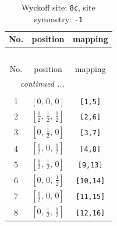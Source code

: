 \documentclass[fleqn,8pt]{jsarticle}
\begin{document}
\renewcommand{\arraystretch}{1.2}
\begin{longtable}{ccc}
\caption{Wyckoff site: {\tt 8c}, site symmetry: {\tt -1}}
 \\
 \hline \hline
No. & position & mapping \\ \hline \endfirsthead

\multicolumn{2}{l}{\tablename\ \thetable{}} \\
 \hline \hline
No. & position & mapping \\ \hline \endhead

 \hline \hline
\multicolumn{2}{r}{\footnotesize\it continued ...} \\ \endfoot

 \hline \hline
\multicolumn{2}{r}{} \\ \endlastfoot

1 & $\left[ 0,\, 0,\, 0 \right]$ & {\tt [1,5]} \\ \hline
2 & $\left[ \frac{1}{2},\, \frac{1}{2},\, \frac{1}{2} \right]$ & {\tt [2,6]} \\ \hline
3 & $\left[ 0,\, \frac{1}{2},\, 0 \right]$ & {\tt [3,7]} \\ \hline
4 & $\left[ \frac{1}{2},\, 0,\, \frac{1}{2} \right]$ & {\tt [4,8]} \\ \hline
5 & $\left[ \frac{1}{2},\, \frac{1}{2},\, 0 \right]$ & {\tt [9,13]} \\ \hline
6 & $\left[ 0,\, 0,\, \frac{1}{2} \right]$ & {\tt [10,14]} \\ \hline
7 & $\left[ \frac{1}{2},\, 0,\, 0 \right]$ & {\tt [11,15]} \\ \hline
8 & $\left[ 0,\, \frac{1}{2},\, \frac{1}{2} \right]$ & {\tt [12,16]} \\
\end{longtable}
\renewcommand{\arraystretch}{1.2}
\end{document}
